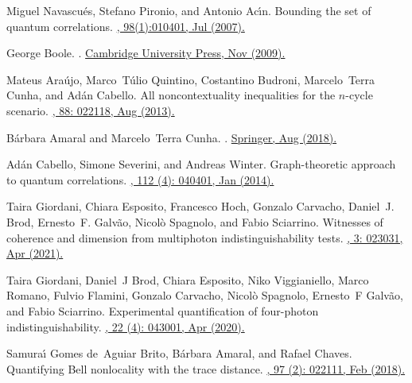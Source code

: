 \documentclass[a4paper,twocolumn,11pt,accepted=2024-01-17]{quantumarticle}
\begin{document}
\begin{thebibliography}{100}
Miguel Navascu{\'e}s, Stefano Pironio, and Antonio Ac{\'\i}n.
\newblock Bounding the set of quantum correlations.
\href{https://doi.org/10.1103/PhysRevLett.98.010401}{, 98(1):010401, Jul (2007).}

George Boole.
.
\href{https://doi.org/10.1017/CBO9780511693090}{\newblock Cambridge University Press, Nov (2009).}

Mateus Ara\'ujo, Marco~T\'ulio Quintino, Costantino Budroni, Marcelo~Terra
  Cunha, and Ad\'an Cabello.
\newblock All noncontextuality inequalities for the $n$-cycle scenario.
\href{https://doi.org/10.1103/PhysRevA.88.022118}{, 88: 022118, Aug (2013).}

B\'{a}rbara Amaral and Marcelo~Terra Cunha.
.
\href{https://doi.org/10.1007/978-3-319-93827-1}{\newblock Springer, Aug (2018).}

Ad{\'a}n Cabello, Simone Severini, and Andreas Winter.
\newblock Graph-theoretic approach to quantum correlations.
\href{https://doi.org/10.1103/PhysRevLett.112.040401}{, 112 (4): 040401, Jan (2014).}

Taira Giordani, Chiara Esposito, Francesco Hoch, Gonzalo Carvacho, Daniel~J.
  Brod, Ernesto~F. Galv\~ao, Nicol\`o Spagnolo, and Fabio Sciarrino.
\newblock Witnesses of coherence and dimension from multiphoton indistinguishability tests.
\href{https://doi.org/10.1103/PhysRevResearch.3.023031}{, 3: 023031, Apr (2021).}

Taira Giordani, Daniel~J Brod, Chiara Esposito, Niko Viggianiello, Marco
  Romano, Fulvio Flamini, Gonzalo Carvacho, Nicol{\`o} Spagnolo, Ernesto~F
  Galv{\~a}o, and Fabio Sciarrino.
\newblock Experimental quantification of four-photon indistinguishability.
\href{http://dx.doi.org/10.1088/1367-2630/ab7a30}{, 22 (4): 043001, Apr (2020).}

Samura{\'\i} Gomes de~Aguiar Brito, B\'{a}rbara Amaral, and Rafael Chaves.
\newblock Quantifying {B}ell nonlocality with the trace distance.
\href{https://doi.org/10.1103/PhysRevA.97.022111}{, 97 (2): 022111, Feb (2018).}


\end{thebibliography}
\end{document}
